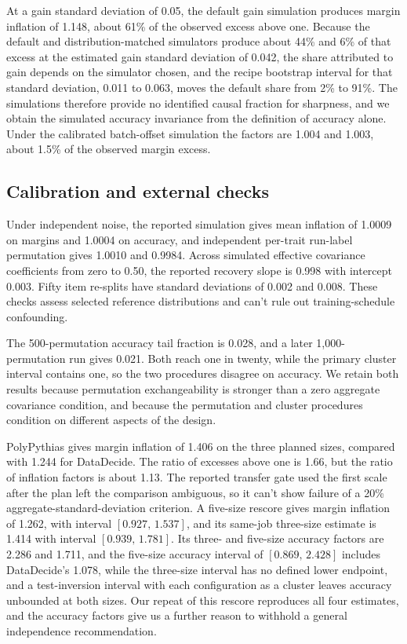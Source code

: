\documentclass{article}
\newcommand{\ci}[2]{\ensuremath{[#1,\,#2]}}
\begin{document}
At a gain standard deviation of 0.05, the default gain simulation produces margin inflation of 1.148, about 61\% of the observed excess above one. Because the default and distribution-matched simulators produce about 44\% and 6\% of that excess at the estimated gain standard deviation of 0.042, the share attributed to gain depends on the simulator chosen, and the recipe bootstrap interval for that standard deviation, 0.011 to 0.063, moves the default share from 2\% to 91\%. The simulations therefore provide no identified causal fraction for sharpness, and we obtain the simulated accuracy invariance from the definition of accuracy alone. Under the calibrated batch-offset simulation the factors are 1.004 and 1.003, about 1.5\% of the observed margin excess.

\subsection{Calibration and external checks}
Under independent noise, the reported simulation gives mean inflation of 1.0009 on margins and 1.0004 on accuracy, and independent per-trait run-label permutation gives 1.0010 and 0.9984. Across simulated effective covariance coefficients from zero to 0.50, the reported recovery slope is 0.998 with intercept 0.003. Fifty item re-splits have standard deviations of 0.002 and 0.008. These checks assess selected reference distributions and can't rule out training-schedule confounding.

The 500-permutation accuracy tail fraction is 0.028, and a later 1,000-permutation run gives 0.021. Both reach one in twenty, while the primary cluster interval contains one, so the two procedures disagree on accuracy. We retain both results because permutation exchangeability is stronger than a zero aggregate covariance condition, and because the permutation and cluster procedures condition on different aspects of the design.

PolyPythias gives margin inflation of 1.406 on the three planned sizes, compared with 1.244 for DataDecide. The ratio of excesses above one is 1.66, but the ratio of inflation factors is about 1.13. The reported transfer gate used the first scale after the plan left the comparison ambiguous, so it can't show failure of a 20\% aggregate-standard-deviation criterion. A five-size rescore gives margin inflation of 1.262, with interval \ci{0.927}{1.537}, and its same-job three-size estimate is 1.414 with interval \ci{0.939}{1.781}. Its three- and five-size accuracy factors are 2.286 and 1.711, and the five-size accuracy interval of \ci{0.869}{2.428} includes DataDecide's 1.078, while the three-size interval has no defined lower endpoint, and a test-inversion interval with each configuration as a cluster leaves accuracy unbounded at both sizes. Our repeat of this rescore reproduces all four estimates, and the accuracy factors give us a further reason to withhold a general independence recommendation.
\end{document}
